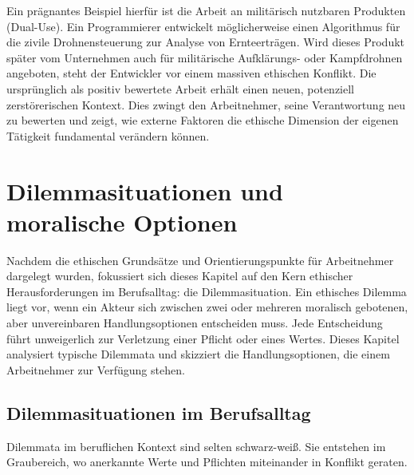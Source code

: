\documentclass[
    12pt,               %
    a4paper,            %
    ngerman             %
]{scrartcl}
\begin{document}
Ein prägnantes Beispiel hierfür ist die Arbeit an militärisch nutzbaren Produkten (Dual-Use). Ein Programmierer entwickelt möglicherweise einen Algorithmus für die zivile Drohnensteuerung zur Analyse von Ernteerträgen. Wird dieses Produkt später vom Unternehmen auch für militärische Aufklärungs- oder Kampfdrohnen angeboten, steht der Entwickler vor einem massiven ethischen Konflikt. Die ursprünglich als positiv bewertete Arbeit erhält einen neuen, potenziell zerstörerischen Kontext. Dies zwingt den Arbeitnehmer, seine Verantwortung neu zu bewerten und zeigt, wie externe Faktoren die ethische Dimension der eigenen Tätigkeit fundamental verändern können.


\section{Dilemmasituationen und moralische Optionen}


 


Nachdem die ethischen Grundsätze und Orientierungspunkte für Arbeitnehmer dargelegt wurden, fokussiert sich dieses Kapitel auf den Kern ethischer Herausforderungen im Berufsalltag: die Dilemmasituation. Ein ethisches Dilemma liegt vor, wenn ein Akteur sich zwischen zwei oder mehreren moralisch gebotenen, aber unvereinbaren Handlungsoptionen entscheiden muss. Jede Entscheidung führt unweigerlich zur Verletzung einer Pflicht oder eines Wertes. Dieses Kapitel analysiert typische Dilemmata und skizziert die Handlungsoptionen, die einem Arbeitnehmer zur Verfügung stehen.

\subsection{Dilemmasituationen im Berufsalltag}
Dilemmata im beruflichen Kontext sind selten schwarz-weiß. Sie entstehen im Graubereich, wo anerkannte Werte und Pflichten miteinander in Konflikt geraten.
\end{document}
